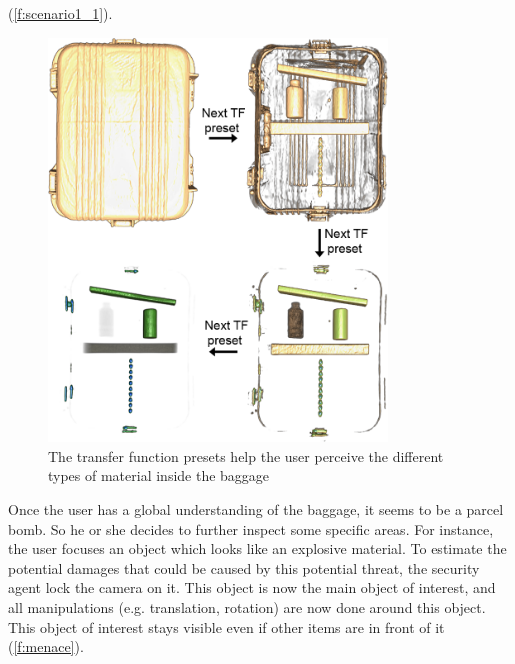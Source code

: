 (\autoref{f:scenario1_1}).
\begin{figure}
\centering
\includegraphics[width=9cm]{Figures/scenario1_1.png}
\caption{ The transfer function presets help the user perceive the different types of material inside the baggage }
\label{f:scenario1_1}
\end{figure}    
Once the user has a global understanding of the baggage, it seems to be a parcel bomb. So he or she decides to further inspect some specific areas. For instance, the user focuses an object which looks like an explosive material. To estimate the potential damages that could be caused by this potential threat, the security agent lock the camera on it. This object is now the main object of interest, and all  manipulations (e.g. translation, rotation) are now done around this object. This object of interest stays visible even if other items are in front of it (\autoref{f:menace}). 

